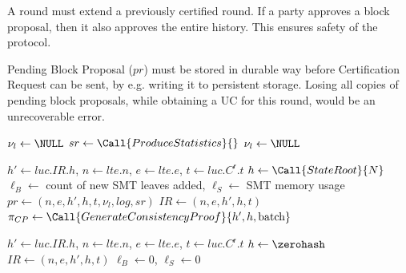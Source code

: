 A round must extend a previously certified round. If a party approves a block proposal, then it also approves the entire history. This ensures safety of the protocol.

Pending Block Proposal ($pr$) must be stored in durable way before Certification Request can be sent, by e.g. writing it to persistent storage. Losing all copies of pending block proposals, while obtaining a UC for this round, would be an unrecoverable error.

\begin{algorithm}
  \caption{Producing a Block Proposal}\label{alg:proposal}
  \begin{algorithmic}[0]
                      
        \State $\nu_l \gets \NULL$
        \State {}  
        \State $sr \gets \Call{ProduceStatistics}{\null}$
        \State {} 
        \State {}
      \EndIf
      \State $\nu_l \gets \NULL$          
    \EndEvent
  \end{algorithmic}
\end{algorithm}

\begin{algorithm}
  \caption{Producing a Certification Request}\label{alg:ucrequest}
  \begin{algorithmic}[0]
      \State $h' \gets luc.IR.h$, $n \gets lte.n$, $e \gets lte.e$, $t \gets luc.C^\mathsf{r}.t$
      \State $h \gets \Call{StateRoot}{N}$
      \State $\ell_B \gets$ count of new SMT leaves added, $\ell_S \gets$ SMT memory usage
      \State $pr \gets (n, e, h', h, t, \nu_l, log, sr)$  
        \State $IR \gets (n, e, h', h, t)$
        \State $\pi_{CP} \gets \Call{GenerateConsistencyProof}{h', h, \text{batch}}$ 
        \State {}
      \Else
        \State {}
        \State {}
      \EndIf
    \EndFunction

      
      \State $h' \gets luc.IR.h$, $n \gets lte.n$, $e \gets lte.e$, $t \gets luc.C^\mathsf{r}.t$
      \State $h \gets \zerohash$
      \State $IR \gets (n, e, h', h, t)$
      \State $\ell_B \gets 0$, $\ell_S \gets 0$ 
      \State {}  
    \EndFunction
  \end{algorithmic}
\end{algorithm}

